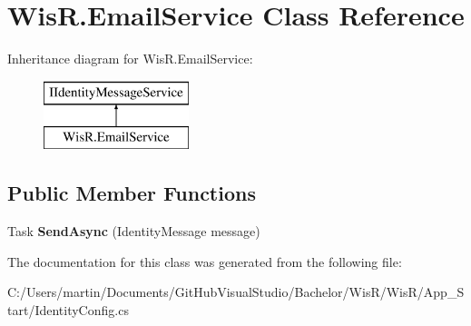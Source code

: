 \hypertarget{class_wis_r_1_1_email_service}{}\section{Wis\+R.\+Email\+Service Class Reference}
\label{class_wis_r_1_1_email_service}
Inheritance diagram for Wis\+R.\+Email\+Service\+:\begin{figure}[H]
\begin{center}
\leavevmode
\includegraphics[height=2.000000cm]{class_wis_r_1_1_email_service}
\end{center}
\end{figure}
\subsection*{Public Member Functions}
\begin{DoxyCompactItemize}
\item 
\hypertarget{class_wis_r_1_1_email_service_adae05b4673dc700a39c7a5946cf26acf}{}Task {\bfseries Send\+Async} (Identity\+Message message)\label{class_wis_r_1_1_email_service_adae05b4673dc700a39c7a5946cf26acf}

\end{DoxyCompactItemize}


The documentation for this class was generated from the following file\+:\begin{DoxyCompactItemize}
\item 
C\+:/\+Users/martin/\+Documents/\+Git\+Hub\+Visual\+Studio/\+Bachelor/\+Wis\+R/\+Wis\+R/\+App\+\_\+\+Start/Identity\+Config.\+cs\end{DoxyCompactItemize}
